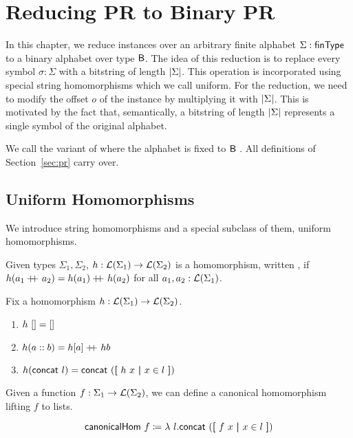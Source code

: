 \newcommand{\strentD}[1]{\ensuremath{\rightsquigarrow^D}}

\chapter{Reducing PR to Binary PR}\label{chap:pr_bpr}
In this chapter, we reduce \PR{} instances over an arbitrary finite alphabet $\Sigma : \textsf{finType}$ to a binary alphabet over type $\textsf{B}$. The idea of this reduction is to replace every symbol $\sigma : \Sigma$ with a bitstring of length $|\Sigma|$. This operation is incorporated using special string homomorphisms which we call uniform.
For the reduction, we need to modify the offset $o$ of the \PR{} instance by multiplying it with $|\Sigma|$. This is motivated by the fact that, semantically, a bitstring of length $|\Sigma|$ represents a single symbol of the original alphabet.

We call the variant of \PR{} where the alphabet is fixed to $\textsf{B}$ \BPR{}. All definitions of Section~\ref{sec:pr} carry over.

\section{Uniform Homomorphisms}
We introduce string homomorphisms and a special subclass of them, uniform homomorphisms. 

\newcommand{\homomorphism}{\textsf{homomorphism}}
\begin{definition}
  Given types $\Sigma_1, \Sigma_2$, $h : \mathcal{L} (\Sigma_1) \rightarrow \mathcal{L} (\Sigma_2)$ is a homomorphism, written \mnotec{$\homomorphism~h$}, if $h (a_1 +\kern-1.3ex+\kern0.8ex a_2) = h(a_1) +\kern-1.3ex+\kern0.8ex h (a_2)$ for all $a_1, a_2 : \mathcal{L} (\Sigma_1)$. 
\end{definition}

\begin{fact}
  Fix a homomorphism $h : \mathcal{L} (\Sigma_1) \rightarrow \mathcal{L} (\Sigma_2)$. 
  \begin{enumerate}
    \item $h~[] = []$
    \item $h (a :: b) = h [a] +\kern-1.3ex+\kern0.8ex h b$
    \item $h (\textsf{concat}~l) = \textsf{concat}~(\textbf{[}~ h~x ~\textbf{|}~ x \in l ~\textbf{]})$
  \end{enumerate}
\end{fact}

Given a function $f : \Sigma_1 \rightarrow \mathcal{L} (\Sigma_2)$, we can define a canonical homomorphism lifting $f$ to lists.
\newcommand{\canonicalHom}{\textsf{canonicalHom}}
\begin{definition}
  \[\canonicalHom~f \defeq \lambda~l. \rconcat~(\withl f~x \withm x \in l \withr)\]
\end{definition}

